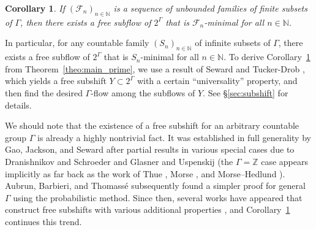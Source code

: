 \documentclass[11pt,reqno,psamsfonts]{amsart}
\theoremstyle{bfnote}
\newtheorem{corl}[theo]{Corollary}
\theoremstyle{definition}
\theoremstyle{remark}
\newcommand{\0}{\varnothing}
\newcommand{\bemph}[1]{{\normalfont#1}}
\newcommand{\ep}[1]{\bemph{(}#1\bemph{)}}
\newcommand{\G}{\Gamma}
\newcommand{\N}{\mathbb{N}}
\newcommand{\Z}{\mathbb{Z}}
\numberwithin{equation}{section}
\begin{document}
    \begin{tcolorbox}
    \begin{corl}\label{corl:subshift}\label{corl:subshift_prime}
        If $(\mathcal{F}_n)_{n \in \N}$ is a sequence of unbounded families of finite subsets of $\G$, then there exists a free subflow of $2^\G$
        that is $\mathcal{F}_n$-minimal for all $n \in \N$.%
    \end{corl}
    \end{tcolorbox}

    In particular, for any countable family $(S_n)_{n \in \N}$ of infinite subsets of $\G$, there exists a free subflow of $2^\G$ %
    that is $S_n$-minimal for all $n \in \N$.    
    To derive Corollary~\ref{corl:subshift} from Theorem~\ref{theo:main_prime}, we use a result of Seward and Tucker-Drob \cite{ST-D}, which yields a free subshift $Y \subset 2^\G$ with a certain ``universality'' property, and then find the desired $\G$-flow among the subflows of $Y$. %
    See \S\ref{sec:subshift} for details.
    
    We should note that the existence of a free subshift for an arbitrary countable group $\G$ is already a highly nontrivial fact. It was established in full generality by Gao, Jackson, and Seward \cite{GJS1,GJS2} after partial results in various special cases due to Dranishnikov and Schroeder \cite{DS} and Glasner and Uspenskij \cite{GU} (the $\G = \Z$ case appears implicitly as far back as the work of Thue \cite{Thue}, Morse \cite{Morse}, and Morse--Hedlund \cite{MorseHedlund}). %
    Aubrun, Barbieri, and Thomass\'{e} \cite{ABT} subsequently found a simpler proof for general $\G$ using the probabilistic method. Since then, several works have appeared that construct free subshifts with various additional properties \cite{ST-D,LLLDyn1,LLLDyn4}, and Corollary~\ref{corl:subshift} continues this trend.
\end{document}
